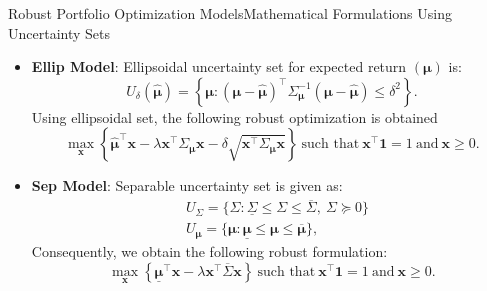\documentclass{beamer}
\begin{document}
\begin{frame}{Robust Portfolio Optimization Models}{Mathematical Formulations Using Uncertainty Sets}
\begin{itemize}
\item{\textbf{Ellip Model}:
   Ellipsoidal uncertainty set for expected return $\left(\boldsymbol{\mu}\right)$ is:
\begin{equation}
\label{eqn:ellipsoidal}
U_{\delta}(\boldsymbol{\hat{\mu}})=\left\{\boldsymbol{\mu}: (\boldsymbol{\mu}-\boldsymbol{\hat{\mu}})^{\top}\Sigma^{-1}_{\boldsymbol{\mu}}
(\boldsymbol{\mu}-\boldsymbol{\hat{\mu}})\leq\delta^2 \right\}.
\end{equation}
Using ellipsoidal set, the following robust optimization is obtained
\begin{equation}
\label{eqn:ellipsoidal_markowitz}
\max\limits_{\mathbf{x}}\left\{\boldsymbol{\hat{\mu}}^{\top}\mathbf{x}-\lambda \mathbf{x}^{\top}\Sigma_{\boldsymbol{\mu}}\mathbf{x}
-\delta\sqrt{\mathbf{x}^{\top}\Sigma_{\boldsymbol{\mu}}\mathbf{x}}\right\}~\text{such that}~\mathbf{x^{\top}}\mathbf{1}=1~\text{and}~\mathbf{x}\geq 0.
\end{equation}
   }
   \item{\textbf{Sep Model}: Separable uncertainty set  is given as:
   \begin{equation}
\label{eqn:separable}
\begin{split}
& U_{\Sigma}=\{\Sigma: \underline{\Sigma} \leq \Sigma \leq \overline{\Sigma},~\Sigma \succeq 0\} \\
& U_{\boldsymbol{\mu}}=\{\boldsymbol{\mu}:\underline{\boldsymbol{\mu}}\leq\boldsymbol{\mu}\leq\overline{\boldsymbol{\mu}}\},
\end{split}
\end{equation}
Consequently, we obtain the following robust formulation:
\begin{equation}
\label{eqn:separable_markowitz}
\max_{\mathbf{x}} \left\{\underline{\boldsymbol{\mu}}^{\top}\mathbf{x}-\lambda \mathbf{x^{\top}}\overline{\Sigma}\mathbf{x}\right\}~\text{such that}~ \mathbf{x^{\top}}\mathbf{1}=1~\text{and}~\mathbf{x}\geq 0.
\end{equation}}
\end{itemize}
\end{frame}
\end{document}

